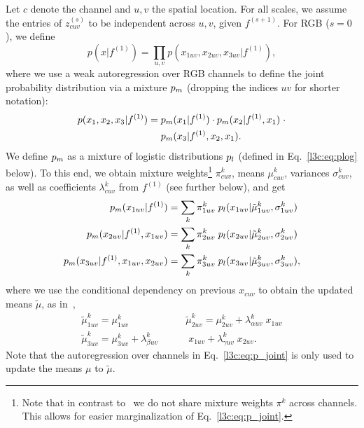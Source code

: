 Let $c$ denote the channel and $u,v$ the spatial location. For all scales, we assume the entries of $z^{(s)}_{cuv}$ to be independent across $u,v$, given $f^{(s+1)}$. 
For RGB ($s=0$), we define
\begin{equation}
    p(x|f^{(1)}) = \prod_{u,v} p(x_{1uv},x_{2uv},x_{3uv}|f^{(1)}), \label{l3c:p_x_factorization}
\end{equation}
    where we use a weak autoregression over RGB channels to define the joint probability distribution via a mixture $p_m$ (dropping the indices $uv$ for shorter notation):
\begin{align}
    p(x_1, x_2, x_3 | f^{(1)}) =\;&p_m(x_1 | f^{(1)}) \cdot p_m(x_2 | f^{(1)}, x_1) \; \cdot \nonumber \\
                                 &p_m(x_3 | f^{(1)}, x_2, x_1) .
    \label{l3c:eq:p_joint}
\end{align}
    We define $p_m$ as a mixture of logistic distributions $p_l$ (defined in Eq.~\eqref{l3c:eq:plog} below). To this end, we obtain mixture weights\footnote{%
    Note that in contrast to~\cite{Salimans2017pcnnpp} we do not share mixture weights $\pi^k$ across channels. This allows for easier marginalization of Eq.~\eqref{l3c:eq:p_joint}.}
    $\pi^k_{cuv}$, means $\mu^k_{cuv}$, variances $\sigma^k_{cuv}$, as well as coefficients $\lambda^k_{cuv}$ from $f^{(1)}$ (see further below), and get
%
\begin{align}
    \pmix(x_{1uv} | f^{(1)}) &= \sum_k \pi^k_{1uv} \; \plogistic(x_{1uv} | \tilde \mu^k_{1uv}, \sigma^k_{1uv}) \nonumber \\
    \pmix(x_{2uv} | f^{(1)}, x_{1uv}) &= \sum_k \pi^k_{2uv} \; \plogistic(x_{2uv} | \tilde \mu^k_{2uv}, \sigma^k_{2uv}) \nonumber \\
    \pmix(x_{3uv} | f^{(1)}, x_{1uv}, x_{2uv}) &= \sum_k \pi^k_{3uv} \; \plogistic(x_{3uv} | \tilde \mu^k_{3uv}, \sigma^k_{3uv}), \label{l3c:eq:p_mix}
%
\end{align}
    where we use the conditional dependency on previous $x_{cuv}$ to obtain the updated means $\tilde \mu$, as in~\cite[Sec. 2.2]{Salimans2017pcnnpp},
\begin{align}
    \tilde \mu^k_{1uv} = \mu^k_{1uv} \nonumber \hspace{5em}
    &\tilde \mu^k_{2uv} = \mu^k_{2uv} + \lambda^k_{\alpha uv} \; x_{1uv} \nonumber  \\
    \tilde \mu^k_{3uv} = \mu^k_{3uv} + \lambda^k_{\beta uv} &\; x_{1uv} + \lambda^k_{\gamma uv} \; x_{2uv}.
    \label{l3c:eq:updating_mus}
\end{align}
%
Note that the autoregression over channels in Eq.~\eqref{l3c:eq:p_joint} is only used to update the means $\mu$ to $\tilde \mu$.

